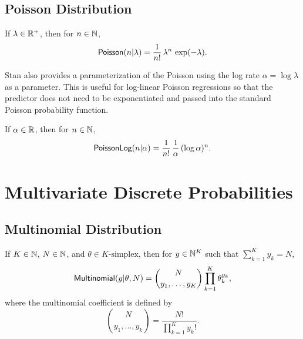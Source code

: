 \begin{description}
%
%
\end{description}


\subsection{Poisson Distribution}

If $\lambda \in \mathbb{R}^+$, then for $n \in \mathbb{N}$,
\[
\mbox{\sf Poisson}(n|\lambda)
= 
\frac{1}{n!}
\,
\lambda^n 
\,
\exp(-\lambda).
\]

\begin{description}
\end{description}


Stan also provides a parameterization of the Poisson using the log
rate $\alpha = \log \lambda$ as a parameter.  This is useful for
log-linear Poisson regressions so that the predictor does not need to
be exponentiated and passed into the standard Poisson probability
function.

If $\alpha \in \mathbb{R}$, then for $n \in \mathbb{N}$,
\[
\mbox{\sf PoissonLog}(n|\alpha)
= 
\frac{1}{n!}
\,
\frac{1}{\alpha}
\,
(\log \alpha)^n.
\]

\begin{description}
\end{description}


\section{Multivariate Discrete Probabilities}

\subsection{Multinomial Distribution}

If $K \in \mathbb{N}$, $N \in \mathbb{N}$, and $\theta \in \mbox{$K$-simplex}$,
then for $y \in \mathbb{N}^K$ such that $\sum_{k=1}^K y_k = N$,
%
\[
\mbox{\sf Multinomial}(y|\theta,N)
= {N \choose {y_1,\ldots,y_K}} 
\prod_{k=1}^K \theta_k^{y_k},
\]
where the multinomial coefficient is defined by
\[
{N \choose {y_1,\ldots,y_k}}
= \frac{N!}{\prod_{k=1}^K y_k!}.
\]

